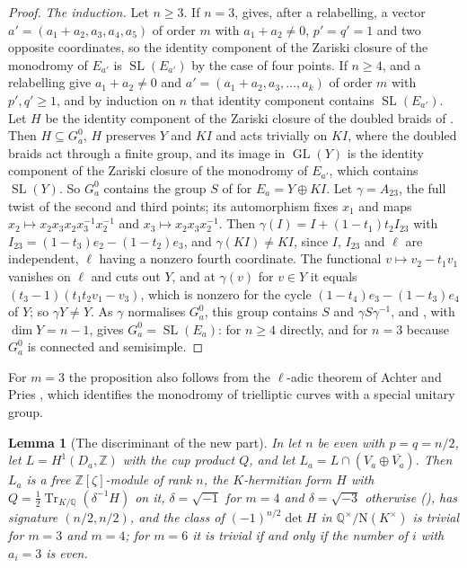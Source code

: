 \documentclass[11pt,reqno]{amsart}
\theoremstyle{plain}
\newtheorem{lemma}[theorem]{Lemma}
\theoremstyle{definition}
\theoremstyle{remark}
\newcommand{\QQ}{\mathbb{Q}}
\newcommand{\ZZ}{\mathbb{Z}}
\newcommand{\Nm}{\mathrm{N}}             %
\DeclareMathOperator{\Tr}{Tr}
\DeclareMathOperator{\GL}{GL}
\DeclareMathOperator{\SL}{SL}
\begin{document}
\begin{proof}
\emph{The induction.} Let $n\ge3$. If $n=3$,  gives,
after a relabelling, a vector $a'=(a_{1}+a_{2},a_{3},a_{4},a_{5})$ of order $m$
with $a_{1}+a_{2}\ne0$, $p'=q'=1$ and two opposite coordinates, so the
identity component of the Zariski closure of the monodromy of $E_{a'}$ is
$\SL(E_{a'})$ by the case of four points. If $n\ge4$,  and
a relabelling give $a_{1}+a_{2}\ne0$ and $a'=(a_{1}+a_{2},a_{3},\dots,a_{k})$
of order $m$ with $p',q'\ge1$, and by induction on $n$ that identity
component contains $\SL(E_{a'})$. Let $H$ be the identity component of the
Zariski closure of the doubled braids of . Then
$H\subseteq G_{a}^{0}$, $H$ preserves $Y$ and $KI$ and acts trivially on
$KI$, where the doubled braids act through a finite group, and its image in
$\GL(Y)$ is the identity component of the Zariski closure of the monodromy of
$E_{a'}$, which contains $\SL(Y)$. So $G_{a}^{0}$ contains the group $S$ of
 for $E_{a}=Y\oplus KI$. Let $\gamma=A_{23}$, the full
twist of the second and third points; its automorphism fixes $x_{1}$ and
maps $x_{2}\mapsto x_{2}x_{3}x_{2}x_{3}^{-1}x_{2}^{-1}$ and $x_{3}\mapsto
x_{2}x_{3}x_{2}^{-1}$. Then $\gamma(I)=I+(1-t_{1})t_{2}I_{23}$ with
$I_{23}=(1-t_{3})e_{2}-(1-t_{2})e_{3}$, and $\gamma(KI)\ne KI$, since $I$,
$I_{23}$ and $\ell$ are independent, $\ell$ having a nonzero fourth
coordinate. The functional $v\mapsto v_{2}-t_{1}v_{1}$ vanishes on $\ell$ and
cuts out $Y$, and at $\gamma(v)$ for $v\in Y$ it equals
$(t_{3}-1)(t_{1}t_{2}v_{1}-v_{3})$, which is nonzero for the cycle
$(1-t_{4})e_{3}-(1-t_{3})e_{4}$ of $Y$; so $\gamma Y\ne Y$. As $\gamma$
normalises $G_{a}^{0}$, this group contains $S$ and $\gamma S\gamma^{-1}$,
and , with $\dim Y=n-1$, gives
$G_{a}^{0}=\SL(E_{a})$: for $n\ge4$ directly, and for $n=3$ because
$G_{a}^{0}$ is connected and semisimple.
\end{proof}

For $m=3$ the proposition also follows from the $\ell$-adic theorem of
Achter and Pries \cite[Corollary~3.10]{AP07}, which identifies the monodromy
of trielliptic curves with a special unitary group.

\begin{lemma}[The discriminant of the new part]\label{lem:newdisc}
In  let $n$ be even with $p=q=n/2$, let
$L=H^{1}(D_{a},\ZZ)$ with the cup product $Q$, and let
$L_{a}=L\cap(V_{a}\oplus\overline{V_{a}})$. Then $L_{a}$ is a free
$\ZZ[\zeta]$-module of rank $n$, the $K$-hermitian form $H$ with
$Q=\tfrac12\Tr_{K/\QQ}(\delta^{-1}H)$ on it, $\delta=\sqrt{-1}$ for $m=4$ and
$\delta=\sqrt{-3}$ otherwise (\cite[Lemma~4.5]{paperI}), has signature
$(n/2,n/2)$, and the class of $(-1)^{n/2}\det H$ in
$\QQ^{\times}/\Nm(K^{\times})$ is trivial for $m=3$ and $m=4$; for $m=6$ it is
trivial if and only if the number of $i$ with $a_{i}=3$ is even.
\end{lemma}
\end{document}
